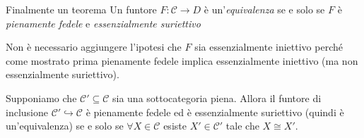 \begin{theorem}{Finalmente un teorema}
    Un funtore \(F : \mathcal{C} \to D\) è un'\emph{equivalenza} se e solo se \(F\) è \emph{pienamente fedele} e \emph{essenzialmente suriettivo}
\end{theorem}
\begin{remark}{}
    Non è necessario aggiungere l'ipotesi che \(F\) sia essenzialmente iniettivo
    perché come mostrato prima pienamente fedele implica essenzialmente
    iniettivo (ma non essenzialmente suriettivo).
\end{remark}
\begin{example}{}
    Supponiamo che \(\mathcal{C}' \subseteq \mathcal{C} \) sia una sottocategoria piena. Allora il
    funtore di inclusione \(\mathcal{C}' \hookrightarrow \mathcal{C}\) è pienamente fedele ed è
    essenzialmente suriettivo (quindi è un'equivalenza) se e solo se \(\forall X \in \mathcal{C}\) esiste \(X' \in \mathcal{C}'\) tale che \(X \cong X'\).
\end{example}

